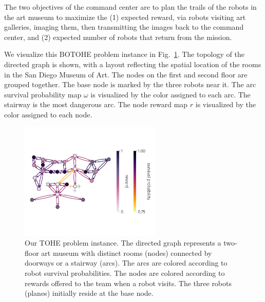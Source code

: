 \documentclass[11pt, oneside]{article}
\begin{document}
The two objectives of the command center are to plan the trails of the robots in the art museum to maximize the (1) expected reward, via robots visiting art galleries, imaging them, then transmitting the images back to the command center, and (2) expected number of robots that return from the mission. 

We visualize this BOTOHE problem instance in Fig.~\ref{fig:ex_setup}. 
The topology of the directed graph is shown, with a layout reflecting the spatial location of the rooms in the San Diego Museum of Art. The nodes on the first and second floor are grouped together.
The base node is marked by the three robots near it.
The arc survival probability map $\omega$ is visualized by the color assigned to each arc.
The stairway is the most dangerous arc.
The node reward map $r$ is visualized by the color assigned to each node. 


\begin{figure}[h!]
    \centering
    	\includegraphics[width=0.6\textwidth]{../art_museum_full_setup.pdf}
    \caption{Our TOHE problem instance. The directed graph represents a two-floor art museum with distinct rooms (nodes) connected by doorways or a stairway (arcs). The arcs are colored according to robot survival probabilities. The nodes are colored according to rewards offered to the team when a robot visits. The three robots (planes) initially reside at the base node. %
    } \label{fig:ex_setup}
\end{figure}
\end{document}

